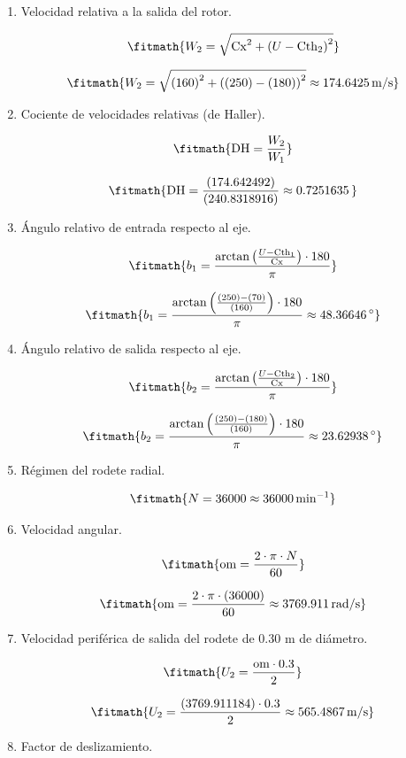 \begin{enumerate}
\item Velocidad relativa a la salida del rotor.

\[\fitmath{W_{2}=\sqrt{{\mathrm{Cx}}^{2}+{\left(U-\mathrm{Cth}_{2}\right)}^{2}}}\]

\[\fitmath{W_{2}=\sqrt{{(160)}^{2}+{\left((250)-(180)\right)}^{2}}\approx 174.6425\,\mathrm{m/s}}\]

\item Cociente de velocidades relativas (de Haller).

\[\fitmath{\mathrm{DH}=\frac{W_{2}}{W_{1}}}\]

\[\fitmath{\mathrm{DH}=\frac{(174.642492)}{(240.8318916)}\approx 0.7251635\,}\]

\item Ángulo relativo de entrada respecto al eje.

\[\fitmath{b_{1}=\frac{\arctan\left(\frac{U-\mathrm{Cth}_{1}}{\mathrm{Cx}}\right)\cdot 180}{\pi}}\]

\[\fitmath{b_{1}=\frac{\arctan\left(\frac{(250)-(70)}{(160)}\right)\cdot 180}{\pi}\approx 48.36646\,{}^{\circ}}\]

\item Ángulo relativo de salida respecto al eje.

\[\fitmath{b_{2}=\frac{\arctan\left(\frac{U-\mathrm{Cth}_{2}}{\mathrm{Cx}}\right)\cdot 180}{\pi}}\]

\[\fitmath{b_{2}=\frac{\arctan\left(\frac{(250)-(180)}{(160)}\right)\cdot 180}{\pi}\approx 23.62938\,{}^{\circ}}\]

\item Régimen del rodete radial.

\[\fitmath{N=36000\approx 36000\,\mathrm{min^{-1}}}\]

\item Velocidad angular.

\[\fitmath{\mathrm{om}=\frac{2\cdot \pi\cdot N}{60}}\]

\[\fitmath{\mathrm{om}=\frac{2\cdot \pi\cdot (36000)}{60}\approx 3769.911\,\mathrm{rad/s}}\]

\item Velocidad periférica de salida del rodete de 0.30 m de diámetro.

\[\fitmath{U_{2}=\frac{\mathrm{om}\cdot 0.3}{2}}\]

\[\fitmath{U_{2}=\frac{(3769.911184)\cdot 0.3}{2}\approx 565.4867\,\mathrm{m/s}}\]

\item Factor de deslizamiento.


\end{enumerate}
